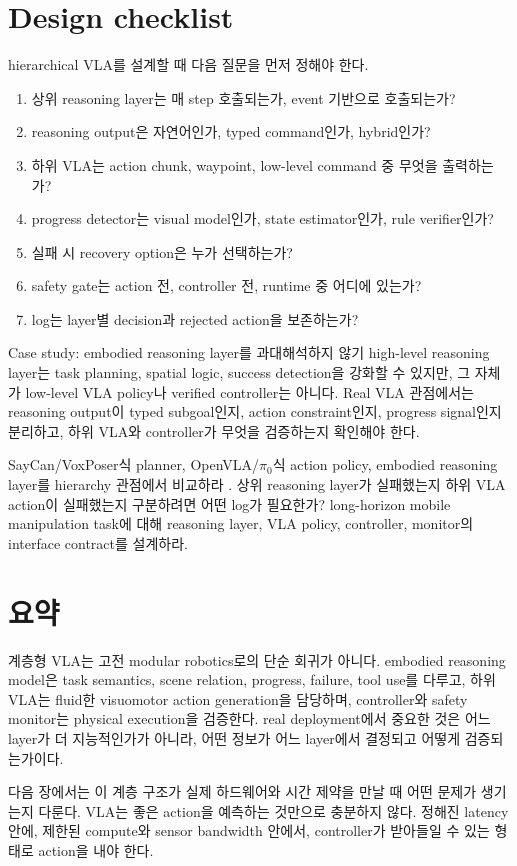 \section{Design checklist}

hierarchical VLA를 설계할 때 다음 질문을 먼저 정해야 한다.
\begin{enumerate}
  \item 상위 reasoning layer는 매 step 호출되는가, event 기반으로 호출되는가?
  \item reasoning output은 자연어인가, typed command인가, hybrid인가?
  \item 하위 VLA는 action chunk, waypoint, low-level command 중 무엇을 출력하는가?
  \item progress detector는 visual model인가, state estimator인가, rule verifier인가?
  \item 실패 시 recovery option은 누가 선택하는가?
  \item safety gate는 action 전, controller 전, runtime 중 어디에 있는가?
  \item log는 layer별 decision과 rejected action을 보존하는가?
\end{enumerate}

\begin{casebox}{Case study: embodied reasoning layer를 과대해석하지 않기}
high-level reasoning layer는 task planning, spatial logic, success detection을 강화할 수 있지만, 그 자체가 low-level VLA policy나 verified controller는 아니다. Real VLA 관점에서는 reasoning output이 typed subgoal인지, action constraint인지, progress signal인지 분리하고, 하위 VLA와 controller가 무엇을 검증하는지 확인해야 한다.
\end{casebox}

\chapterwork
{SayCan/VoxPoser식 planner, OpenVLA/$\pi_0$식 action policy, embodied reasoning layer를 hierarchy 관점에서 비교하라 \cite{saycan2022,voxposer2023,openvla2024,pi02024}.}
{상위 reasoning layer가 실패했는지 하위 VLA action이 실패했는지 구분하려면 어떤 log가 필요한가?}
{long-horizon mobile manipulation task에 대해 reasoning layer, VLA policy, controller, monitor의 interface contract를 설계하라.}

\section{요약}

계층형 VLA는 고전 modular robotics로의 단순 회귀가 아니다. embodied reasoning model은 task semantics, scene relation, progress, failure, tool use를 다루고, 하위 VLA는 fluid한 visuomotor action generation을 담당하며, controller와 safety monitor는 physical execution을 검증한다. real deployment에서 중요한 것은 어느 layer가 더 지능적인가가 아니라, 어떤 정보가 어느 layer에서 결정되고 어떻게 검증되는가이다.

다음 장에서는 이 계층 구조가 실제 하드웨어와 시간 제약을 만날 때 어떤 문제가 생기는지 다룬다. VLA는 좋은 action을 예측하는 것만으로 충분하지 않다. 정해진 latency 안에, 제한된 compute와 sensor bandwidth 안에서, controller가 받아들일 수 있는 형태로 action을 내야 한다.
